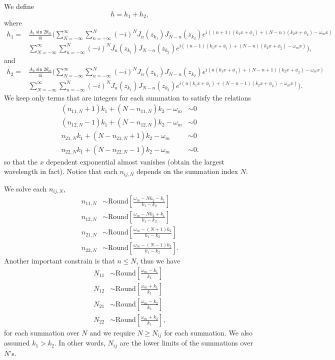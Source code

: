 We define
\begin{equation}
   h = h_1 + h_2, 
\end{equation}
where
\begin{align}
   h_1 =& \frac{A_1\sin 2\theta_m}{4i}\bigg( \sum_{N=-\infty}^\infty \sum_{n=-\infty}^N (-i)^N J_n(z_{k_1}) J_{N-n}(z_{k_2}) e^{ i  \left(  (n+1) (k_1 x + \phi_1) +  (N-n)(k_2 x + \phi_2) - \omega_m x \right) } \nonumber \\
   & \sum_{N=-\infty}^\infty \sum_{n=-\infty}^N (-i)^N J_n(z_{k_1}) J_{N-n}(z_{k_2}) e^{ i \left(  (n-1) (k_1 x + \phi_1) + (N-n)(k_2 x + \phi_2) -  \omega_m x \right) }  \bigg),
\end{align}
and
\begin{align}
   h_2=& \frac{A_2\sin 2\theta_m}{4i}\bigg( \sum_{N=-\infty}^\infty \sum_{n=-\infty}^N (-i)^N J_n(z_{k_1}) J_{N-n}(z_{k_2}) e^{ i  \left(  n (k_1 x + \phi_1) + (N-n+1)(k_2 x + \phi_2) -  \omega_m x \right) } \nonumber\\
   & \sum_{N=-\infty}^\infty \sum_{n=-\infty}^N (-i)^N J_n(z_{k_1}) J_{N-n}(z_{k_2}) e^{ i  \left(  n (k_1 x + \phi_1) + (N-n-1)(k_2 x + \phi_2) -  \omega_m x \right) }  \bigg).
\end{align}
We keep only terms that are integers for each summation to satisfy the relations
\begin{align}
   (n_{11,N} + 1)k_1 + (N-n_{11,N}) k_2 -\omega_m &\sim 0 \\
   (n_{12,N} - 1)k_1 + (N-n_{12,N}) k_2 -\omega_m &\sim 0 \\
   n_{21,N}k_1 + (N-n_{21,N}+1) k_2 -\omega_m &\sim 0 \\
   n_{22,N} k_1 + (N-n_{22,N}-1) k_2 -\omega_m &\sim 0.
\end{align}
so that the $x$ dependent exponential almost vanishes (obtain the largest wavelength in fact). Notice that each $n_{ij,N}$ depends on the summation index $N$.

We solve each $n_{ij,N}$,
\begin{align}
   n_{11,N} &\sim \mathrm{Round}\left[\frac{\omega_m - N k_2 -k_1}{k_1 - k_2} \right] \\
   n_{12,N} &\sim \mathrm{Round}\left[\frac{\omega_m - N k_2 + k_1}{k_1 - k_2}\right] \\
   n_{21,N} &\sim \mathrm{Round}\left[\frac{\omega_m - (N + 1) k_2 }{k_1 - k_2} \right]\\
   n_{22,N} &\sim \mathrm{Round}\left[\frac{\omega_m - (N - 1) k_2 }{k_1 - k_2} \right].
\end{align}
Another important constrain is that $n\leq N$, thus we have
\begin{align}
   N_{11} &\sim \mathrm{Round}\left[\frac{\omega_m - k_1}{k_1}\right] \\
   N_{12} &\sim \mathrm{Round}\left[\frac{\omega_m + k_1}{k_1}\right] \\
   N_{21} &\sim \mathrm{Round}\left[\frac{\omega_m - k_2}{k_1}\right] \\
   N_{22} &\sim \mathrm{Round}\left[\frac{\omega_m + k_2}{k_1}\right],
\end{align}
for each summation over $N$ and we require $N\geq N_{ij}$ for each summation. We also assumed $k_1 > k_2$. In other words, $N_{ij}$ are the lower limits of the summations over $N$'s.

